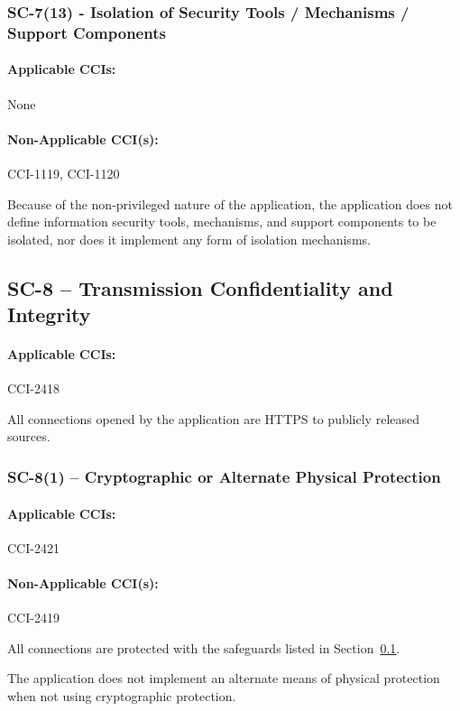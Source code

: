 \documentclass[letterpaper, 10pt, twoside]{article}
\begin{document}
\subsubsection{SC-7(13) - Isolation of Security Tools / Mechanisms / Support Components}

\paragraph{Applicable CCIs:} None

\paragraph{Non-Applicable CCI(s):} CCI-1119, CCI-1120

Because of the non-privileged nature of the application, the application does not define information security tools, mechanisms, and support components to be isolated, nor does it implement any form of isolation mechanisms.

\subsection{SC-8 -- Transmission Confidentiality and Integrity}
\label{sec:sc-8}

\paragraph{Applicable CCIs:} CCI-2418

All connections opened by the application are HTTPS to publicly released sources.

\subsubsection{SC-8(1) -- Cryptographic or Alternate Physical Protection}

\paragraph{Applicable CCIs:} CCI-2421

\paragraph{Non-Applicable CCI(s):} CCI-2419

All connections are protected with the safeguards listed in Section~\ref{sec:sc-8}.

The application does not implement an alternate means of physical protection when not using cryptographic protection.
\end{document}
